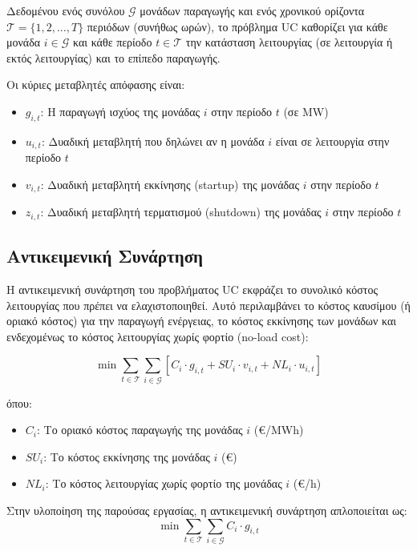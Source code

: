 Δεδομένου ενός συνόλου $\mathcal{G}$ μονάδων παραγωγής και ενός χρονικού ορίζοντα $\mathcal{T} = \{1, 2, \ldots, T\}$ περιόδων (συνήθως ωρών), το πρόβλημα UC καθορίζει για κάθε μονάδα $i \in \mathcal{G}$ και κάθε περίοδο $t \in \mathcal{T}$ την κατάσταση λειτουργίας (σε λειτουργία ή εκτός λειτουργίας) και το επίπεδο παραγωγής.

Οι κύριες μεταβλητές απόφασης είναι:
\begin{itemize}
    \item $g_{i,t}$: Η παραγωγή ισχύος της μονάδας $i$ στην περίοδο $t$ (σε MW)
    \item $u_{i,t}$: Δυαδική μεταβλητή που δηλώνει αν η μονάδα $i$ είναι σε λειτουργία στην περίοδο $t$
    \item $v_{i,t}$: Δυαδική μεταβλητή εκκίνησης (startup) της μονάδας $i$ στην περίοδο $t$
    \item $z_{i,t}$: Δυαδική μεταβλητή τερματισμού (shutdown) της μονάδας $i$ στην περίοδο $t$
\end{itemize}

\subsection{Αντικειμενική Συνάρτηση}
\label{subsec:uc-objective}

Η αντικειμενική συνάρτηση του προβλήματος UC εκφράζει το συνολικό κόστος λειτουργίας που πρέπει να ελαχιστοποιηθεί. Αυτό περιλαμβάνει το κόστος καυσίμου (ή οριακό κόστος) για την παραγωγή ενέργειας, το κόστος εκκίνησης των μονάδων και ενδεχομένως το κόστος λειτουργίας χωρίς φορτίο (no-load cost):

\begin{equation}
\label{eq:uc-objective}
\min \sum_{t \in \mathcal{T}} \sum_{i \in \mathcal{G}} \left[ C_i \cdot g_{i,t} + SU_i \cdot v_{i,t} + NL_i \cdot u_{i,t} \right]
\end{equation}

όπου:
\begin{itemize}
    \item $C_i$: Το οριακό κόστος παραγωγής της μονάδας $i$ (€/MWh)
    \item $SU_i$: Το κόστος εκκίνησης της μονάδας $i$ (€)
    \item $NL_i$: Το κόστος λειτουργίας χωρίς φορτίο της μονάδας $i$ (€/h)
\end{itemize}

Στην υλοποίηση της παρούσας εργασίας, η αντικειμενική συνάρτηση απλοποιείται ως:
\begin{equation}
\label{eq:uc-objective-simplified}
\min \sum_{t \in \mathcal{T}} \sum_{i \in \mathcal{G}} C_i \cdot g_{i,t}
\end{equation}

